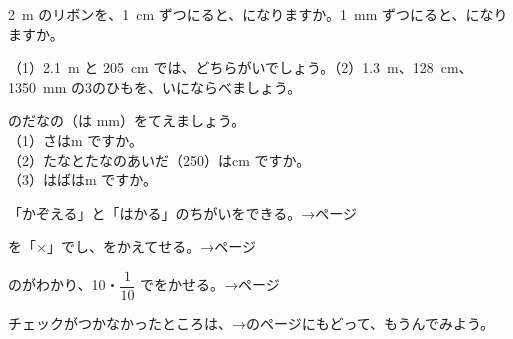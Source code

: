 \clearpage
{}

\bkproblem \qty{2}{m} のリボンを、\qty{1}{cm} ずつにると、になりますか。\qty{1}{mm} ずつにると、になりますか。

\bkproblem （1）\qty{2.1}{m} と \qty{205}{cm} では、どちらがいでしょう。（2）\qty{1.3}{m}、\qty{128}{cm}、\qty{1350}{mm} の3のひもを、いにならべましょう。

\noindent\begin{minipage}[c]{0.62\linewidth}
\bkproblem {}のだなの（は mm）をてえましょう。\\
（1）さはm ですか。\\（2）たなとたなのあいだ（250）はcm ですか。\\（3）はばはm ですか。
\end{minipage}\hfill
\begin{minipage}[c]{0.36\linewidth}\centering
{}
\end{minipage}

\begin{furikaeri}
\begin{checklist}
\item 「かぞえる」と「はかる」のちがいをできる。\hfill{\footnotesize\sffamily\color{bkTheme}→\pageref{bk:2-1:kazoeru}ページ}
\item {}を「×」でし、をかえてせる。\hfill{\footnotesize\sffamily\color{bkTheme}→\pageref{bk:2-1:tani}ページ}
\item {}のがわかり、10・$\dfrac{1}{10}$ でをかせる。\hfill{\footnotesize\sffamily\color{bkTheme}→\pageref{bk:2-1:kurai}ページ}
\end{checklist}
チェックがつかなかったところは、→のページにもどって、もうんでみよう。
\end{furikaeri}

